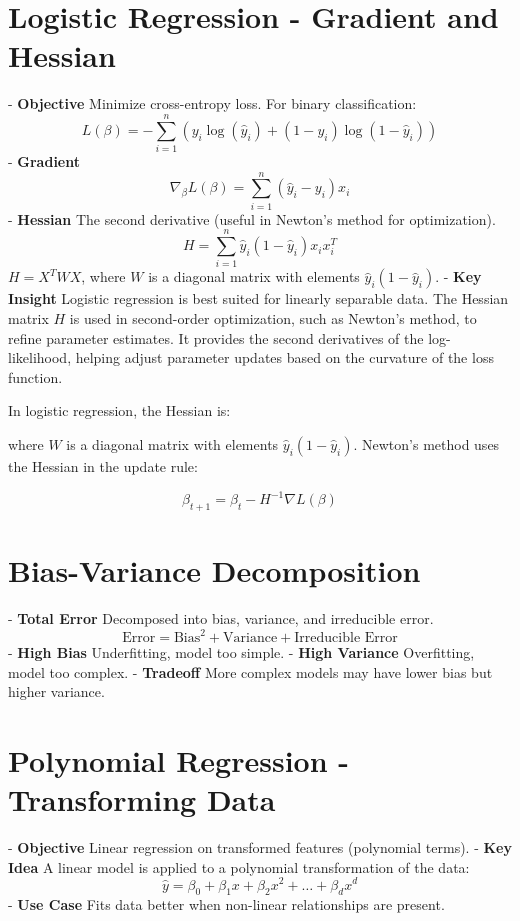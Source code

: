 \documentclass[10pt]{article}
\begin{document}
\begin{multicols}{2}
\section*{Logistic Regression - Gradient and Hessian}
- \textbf{Objective} Minimize cross-entropy loss. For binary classification:
  \[
  L(\beta) = - \sum_{i=1}^{n} \left( y_i \log(\hat{y}_i) + (1 - y_i) \log(1 - \hat{y}_i) \right)
  \]
- \textbf{Gradient} 
  \[
  \nabla_{\beta} L(\beta) = \sum_{i=1}^{n} \left( \hat{y}_i - y_i \right) x_i
  \]
- \textbf{Hessian} The second derivative (useful in Newton’s method for optimization).
  \[
  H = \sum_{i=1}^{n} \hat{y}_i (1 - \hat{y}_i) x_i x_i^T
  \]
  $H = X^T W X$, where $W$ is a diagonal matrix with elements $\hat{y}_i(1 - \hat{y}_i)$.
- \textbf{Key Insight} Logistic regression is best suited for linearly separable data. The Hessian matrix \( H \) is used in second-order optimization, such as Newton’s method, to refine parameter estimates. It provides the second derivatives of the log-likelihood, helping adjust parameter updates based on the curvature of the loss function.

In logistic regression, the Hessian is:



where \( W \) is a diagonal matrix with elements \( \hat{y}_i(1 - \hat{y}_i) \). Newton's method uses the Hessian in the update rule:

\[
\beta_{t+1} = \beta_t - H^{-1} \nabla L(\beta)
\]

\section*{Bias-Variance Decomposition}
- \textbf{Total Error} Decomposed into bias, variance, and irreducible error.
  \[
  \text{Error} = \text{Bias}^2 + \text{Variance} + \text{Irreducible Error}
  \]
- \textbf{High Bias} Underfitting, model too simple.
- \textbf{High Variance} Overfitting, model too complex.
- \textbf{Tradeoff} More complex models may have lower bias but higher variance.

\section*{Polynomial Regression - Transforming Data}
- \textbf{Objective} Linear regression on transformed features (polynomial terms).
- \textbf{Key Idea} A linear model is applied to a polynomial transformation of the data:
  \[
  \hat{y} = \beta_0 + \beta_1 x + \beta_2 x^2 + \dots + \beta_d x^d
  \]
- \textbf{Use Case} Fits data better when non-linear relationships are present.


\end{multicols}
\end{document}
